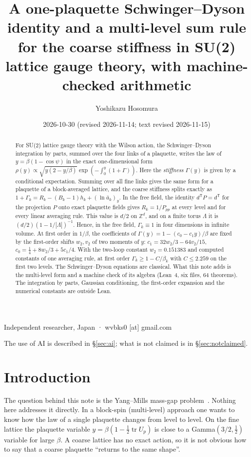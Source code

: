 \documentclass[11pt,a4paper]{article}
\title{A one-plaquette Schwinger--Dyson identity and a multi-level sum rule for the coarse stiffness in SU(2) lattice gauge theory, with machine-checked arithmetic}
\author{Yoshikazu Hosomura}
\date{2026-10-30 (revised 2026-11-14; text revised 2026-11-15)}
\theoremstyle{definition}
\theoremstyle{remark}
\newcommand{\abar}{\bar a}
\begin{document}
\maketitle
\begin{center}\small Independent researcher, Japan · wvbks0 [at] gmail.com\end{center}
\begin{center}\small The use of AI is described in \S\ref{sec:ai}; what is not claimed is in \S\ref{sec:notclaimed}.\end{center}

\begin{abstract}
For SU(2) lattice gauge theory with the Wilson action, the Schwinger--Dyson integration by parts, summed over the four links of a plaquette, writes the law of $y=\beta(1-\cos\psi)$ in the exact one-dimensional form $\rho(y)\propto\sqrt{y(2-y/\beta)}\exp(-\int_0^y(1+\Gamma))$. Here the \emph{stiffness} $\Gamma(y)$ is given by a conditional expectation. Summing over all fine links gives the same form for a plaquette of a block-averaged lattice, and the coarse stiffness splits exactly as $1+\Gamma_k=R_k-(B_k-1)h_k+(\ln\abar_k)_y$. In the free field, the identity $d^{\mathsf T}P=d^{\mathsf T}$ for the projection $P$ onto exact plaquette fields gives $R_k=1/P_{pp}$ at every level and for every linear averaging rule. This value is $d/2$ on $\mathbb Z^d$, and on a finite torus $\Lambda$ it is $(d/2)(1-1/|\Lambda|)^{-1}$. Hence, in the free field, $\Gamma_k\equiv1$ in four dimensions in infinite volume. At first order in $1/\beta$, the coefficients of $\Gamma(y)=1-(c_0-c_1y)/\beta$ are fixed by the first-order shifts $w_2,v_2$ of two moments of $y$: $c_1=32w_2/3-64v_2/15$, $c_0=\tfrac14+8w_2/3+5c_1/4$. With the two-loop constant $w_2=0.151383$ and computed constants of one averaging rule, at first order $\Gamma_k\ge1-C/\beta_k$ with $C\le2.259$ on the first two levels. The Schwinger--Dyson equations are classical. What this note adds is the multi-level form and a machine check of its algebra (Lean~4, six files, 64 theorems). The integration by parts, Gaussian conditioning, the first-order expansion and the numerical constants are outside Lean.
\end{abstract}

\section{Introduction}\label{sec:intro}

The question behind this note is the Yang--Mills mass-gap problem~\cite{JW}. Nothing here addresses it directly. In a block-spin (multi-level) approach one wants to know how the law of a single plaquette changes from level to level. On the fine lattice the plaquette variable $y=\beta(1-\tfrac12\operatorname{tr}U_p)$ is close to a Gamma$(3/2,\tfrac12)$ variable for large $\beta$. A coarse lattice has no exact action, so it is not obvious how to say that a coarse plaquette ``returns to the same shape''.
\end{document}
